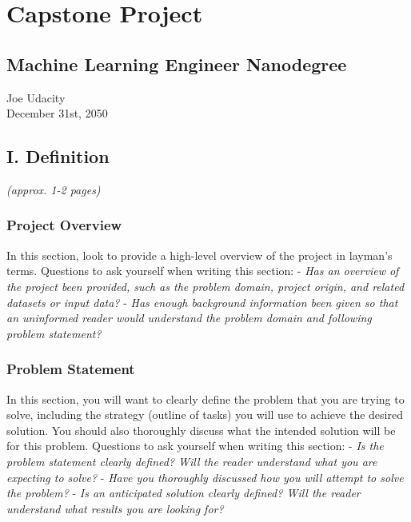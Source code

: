 \documentclass[]{article}
\author{}
\date{}
\begin{document}
\section{Capstone Project}\label{capstone-project}

\subsection{Machine Learning Engineer
Nanodegree}\label{machine-learning-engineer-nanodegree}

Joe Udacity\\December 31st, 2050

\subsection{I. Definition}\label{i.-definition}

\emph{(approx. 1-2 pages)}

\subsubsection{Project Overview}\label{project-overview}

In this section, look to provide a high-level overview of the project in
layman's terms. Questions to ask yourself when writing this section: -
\emph{Has an overview of the project been provided, such as the problem
domain, project origin, and related datasets or input data?} - \emph{Has
enough background information been given so that an uninformed reader
would understand the problem domain and following problem statement?}

\subsubsection{Problem Statement}\label{problem-statement}

In this section, you will want to clearly define the problem that you
are trying to solve, including the strategy (outline of tasks) you will
use to achieve the desired solution. You should also thoroughly discuss
what the intended solution will be for this problem. Questions to ask
yourself when writing this section: - \emph{Is the problem statement
clearly defined? Will the reader understand what you are expecting to
solve?} - \emph{Have you thoroughly discussed how you will attempt to
solve the problem?} - \emph{Is an anticipated solution clearly defined?
Will the reader understand what results you are looking for?}
\end{document}
